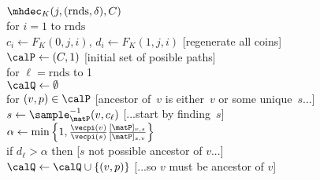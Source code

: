 \begin{figure}
\center
{} 
{
\underline{$\mhdec_K(j,(\mathrm{rnds},\delta),C)$}\\[2pt]
for $i=1$ to $\mathrm{rnds}$\\
\nudge $c_i \gets F_K(0,j,i)$, $d_i \gets F_K(1,j,i)$ \hfill{\tiny [regenerate all coins]}\\
$\calP \gets (C,1)$ \hfill{\tiny [initial set of posible paths]}\\
for $\ell=\mathrm{rnds}$ to 1\\
\nudge $\calQ \gets \emptyset$\\
\nudge for $(v,p) \in \calP$ \hfill{\tiny[ancestor of~$v$ is either~$v$ or some unique~$s$...]}\\
\nnudge $s \gets \sample_{\matP}^{-1}(v,c_\ell)$ \hfill{\tiny[...start by finding~$s$]}\\
\nnudge$\alpha \gets \min\left\{1,\frac{\vecpi(v)}{\vecpi(s)}\frac{[\matP]_{v,s}}{[\matP]_{s,v}} \right\}$\\
\nnudge if $d_\ell > \alpha$ then \hfill{\tiny [$s$ not possible ancestor of $v$...]}\\
\nnudge\nudge $\calQ \gets \calQ \cup \{(v,p)\}$ \hfill{\tiny [...so $v$ must be ancestor of $v$]}\\
}
\end{figure}
